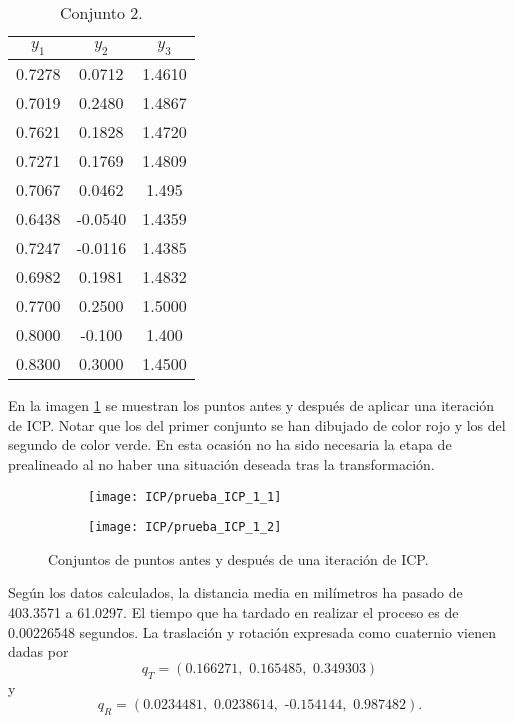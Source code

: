 \begin{table}[h!]
	\centering
	\begin{tabular}{| c | c | c |} 
		\hline
		$ y_1 $ & $ y_2 $ & $ y_3 $ \\
		\hline
		0.7278 &0.0712 & 1.4610 \\ 
		0.7019 & 0.2480 & 1.4867 \\
		0.7621 & 0.1828 & 1.4720 \\
		0.7271 & 0.1769 & 1.4809  \\
		0.7067 & 0.0462 & 1.495 \\
		0.6438 & -0.0540& 1.4359  \\
		0.7247 & -0.0116 & 1.4385 \\
		0.6982 & 0.1981 & 1.4832 \\
		0.7700 & 0.2500 & 1.5000 \\
		0.8000 & -0.100 & 1.400 \\
		0.8300 & 0.3000 & 1.4500 \\
		\hline
	\end{tabular}
	\caption{Conjunto 2.}
	\label{table:2}
\end{table}

En la imagen \ref{fig:ICP_1} se muestran los puntos antes y después de aplicar una iteración de ICP. Notar que los del primer conjunto se han dibujado de color rojo y los del segundo de color verde. En esta ocasión no ha sido necesaria la etapa de prealineado al no haber una situación deseada tras la transformación. \\

\begin{figure}[h!]
	
	\begin{subfigure}{0.5\textwidth}
		\texttt{[image: ICP/prueba\_ICP\_1\_1]} 
	\end{subfigure}
	\begin{subfigure}{0.5\textwidth}
		\texttt{[image: ICP/prueba\_ICP\_1\_2]}
	\end{subfigure}
	
	\caption{Conjuntos de puntos antes y después de una iteración de ICP.}
	\label{fig:ICP_1}
\end{figure}

Según los datos calculados, la distancia media en milímetros ha pasado de 403.3571 a 61.0297. El tiempo que ha tardado en realizar el proceso es de 0.00226548 segundos. La traslación y rotación expresada como cuaternio vienen dadas por 
\[
q_T =  (\text{0.166271}, \text{ 0.165485}, \text{ 0.349303})
\]
y 
\[
q_R = (\text{0.0234481}, \text{ 0.0238614}, \text{ -0.154144}, \text{ 0.987482}).
\]


